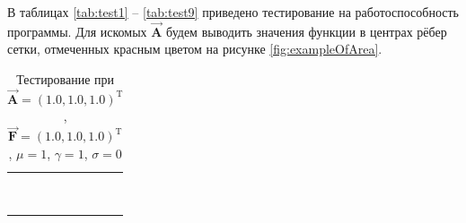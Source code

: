 В таблицах \ref{tab:test1} -- \ref{tab:test9} приведено тестирование на работоспособность программы. Для искомых $\overrightarrow{\textbf{A}}$ будем выводить значения функции в центрах рёбер сетки, отмеченных красным цветом на рисунке \ref{fig:exampleOfArea}.

\begin{table}
	\caption{Тестирование при $\overrightarrow{\textbf{A}} = (1.0, 1.0, 1.0)^{\text{T}}$, $\overrightarrow{\textbf{F}} = (1.0, 1.0, 1.0)^{\text{T}}$, $\mu = 1$, $\gamma = 1$, $\sigma = 0$}
	\centering
	\small
	\begin{tabularx}{1.0\textwidth}{| >{\raggedright\arraybackslash}X | >{\raggedright\arraybackslash}X | >{\raggedright\arraybackslash}X |>{\raggedright\arraybackslash}X |}
		\hline
		\centering{Ребро} & \centering{Значение} & \centering{Абсолютная погрешность} & \centering{Относительная погрешность} \tabularnewline \hline
		
		
		\centering{($x; 1.0; 1.0$)} & \centering{1.00000000E+000}& \centering{0.00000000E+000} & \centering{0.00000000E+000} \tabularnewline \hline
		
		\centering{($x; 2.0; 1.0$)} & \centering{1.00000000E+000}& \centering{0.00000000E+000} & \centering{0.00000000E+000} \tabularnewline \hline
		
		\centering{($x; 1.0; 2.0$)} & \centering{1.00000000E+000}& \centering{0.00000000E+000} & \centering{0.00000000E+000} \tabularnewline \hline
		
		\centering{($x; 2.0; 2.0$)} & \centering{1.00000000E+000}& \centering{0.00000000E+000} & \centering{0.00000000E+000} \tabularnewline \hline
		
		
		
		\centering{($1.0; y; 1.0$)} & \centering{1.00000000E+000}& \centering{0.00000000E+000} & \centering{0.00000000E+000} \tabularnewline \hline
		
		\centering{($2.0; y; 1.0$)} & \centering{1.00000000E+000}& \centering{0.00000000E+000} & \centering{0.00000000E+000} \tabularnewline \hline
		
		\centering{($1.0; y; 2.0$)} & \centering{1.00000000E+000}& \centering{0.00000000E+000} & \centering{0.00000000E+000} \tabularnewline \hline
		
		\centering{($2.0; y; 2.0$)} & \centering{1.00000000E+000}& \centering{0.00000000E+000} & \centering{0.00000000E+000} \tabularnewline \hline
		
		
		
		\centering{($1.0; 1.0; z$)} & \centering{1.00000000E+000}& \centering{0.00000000E+000} & \centering{0.00000000E+000} \tabularnewline \hline
		

\end{tabularx}
\end{table}
